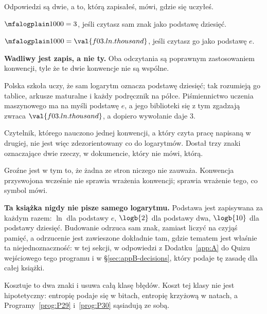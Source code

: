 \begin{fr}
\begin{ansblock}
Odpowiedzi są dwie, a to, którą zapisałeś, mówi, gdzie się uczyłeś.

$\mfalogplain 1000 = 3$, jeśli czytasz sam znak jako podstawę dziesięć.

$\mfalogplain 1000 = \val{f03.ln.thousand}$, jeśli czytasz go jako podstawę
$e$.
\end{ansblock}

\begin{trapbox}
\textbf{Wadliwy jest zapis, a nie ty.} Oba odczytania są poprawnym
zastosowaniem konwencji, tyle że te dwie konwencje nie są wspólne.

Polska szkoła uczy, że sam logarytm oznacza podstawę dziesięć; tak rozumieją
go tablice, arkusze maturalne i każdy podręcznik na półce. Piśmiennictwo
uczenia maszynowego ma na myśli podstawę $e$, a jego biblioteki się z tym
zgadzają \dash{}  zwraca $\val{f03.ln.thousand}$, a
dopiero wywołanie  daje $3$.

Czytelnik, którego nauczono jednej konwencji, a który czyta pracę napisaną w
drugiej, nie jest więc zdezorientowany co do logarytmów. Dostał trzy znaki
oznaczające dwie rzeczy, w dokumencie, który nie mówi, którą.

Groźne jest w tym to, że żadna ze stron niczego nie zauważa. Konwencja
przyswojona wcześnie nie sprawia wrażenia konwencji; sprawia wrażenie tego, co
symbol mówi.
\end{trapbox}

\begin{notationbox}
\textbf{Ta książka nigdy nie pisze samego logarytmu.} Podstawa jest zapisywana
za każdym razem: $\ln$ dla podstawy $e$, $\logb{2}$ dla podstawy dwa,
$\logb{10}$ dla podstawy dziesięć. Budowanie odrzuca sam znak, zamiast liczyć
na czyjąś pamięć, a odrzucenie jest zawieszone dokładnie tam, gdzie tematem
jest właśnie ta niejednoznaczność: w tej sekcji, w odpowiedzi z
Dodatku~\ref{app:A} do Quizu wejściowego tego programu i w
\S\ref{sec:appB-decisions}, który podaje tę zasadę dla całej książki.

Kosztuje to dwa znaki i usuwa całą klasę błędów. Koszt tej klasy nie jest
hipotetyczny: entropię podaje się w bitach, entropię krzyżową w natach, a
Programy~\ref{prog:P29} i~\ref{prog:P30} sąsiadują ze sobą.
\end{notationbox}
\end{fr}

